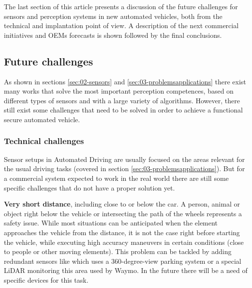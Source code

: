
The last section of this article presents a discussion of the future challenges 
for sensors and perception systems in new automated vehicles, both from the 
technical and implantation point of view. A description of the next 
commercial initiatives and OEMs forecasts is shown followed by the final 
conclusions.


\subsection{Future challenges}

As shown in sections \ref{sec:02-sensors} and \ref{sec:03-problemsapplications} there exist many works that solve the most important perception competences, based on different types of sensors and with a large variety of algorithms. However, there still exist some challenges that need to be solved in order to achieve a functional secure automated vehicle.

\subsubsection{Technical challenges}

Sensor setups in Automated Driving are usually focused on the areas relevant 
for the usual driving tasks (covered in section \ref{sec:03-problemsapplications}). 
But for a commercial system expected to work in the real world there are still
some specific challenges that do not have a proper solution yet.

\textbf{Very short distance}, including close to or below the car.
    A person, animal or object right below the vehicle or intersecting 
    the path of the wheels represents a safety issue. While most situations
    can be anticipated when the element approaches the vehicle from the
    distance, it is not the case right before starting the vehicle, 
    while executing high accuracy maneuvers in certain conditions 
    (close to people or other moving elements).  
    This problem can be tackled by adding redundant sensors like \cite{gandhi2006vehicle}
    which uses a 360-degree-view parking system or a special LiDAR monitoring this area
    used by Waymo.    
    In the future there will be a need of specific devices for this task.
      
